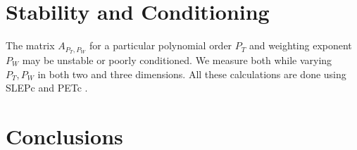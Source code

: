 \documentclass{article}
\begin{document}
\section{Stability and Conditioning}

The matrix $A_{P_T, P_W}$ for a particular polynomial order $P_T$ and
weighting exponent  $P_W$ may be unstable or poorly conditioned.   We
measure both while varying $P_T, P_W$ in both two and three
dimensions.    All these calculations are done using SLEPc and PETc
\cite{petsc-user-ref, petsc-efficient, slepc}.




\section{Conclusions}



\renewcommand{\thefootnote}{\fnsymbol{footnote}}\

\end{document}

